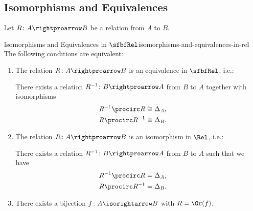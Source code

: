 \subsection{Isomorphisms and Equivalences}\label{subsection-isomorphisms-and-equivalences-in-rel}
Let $R\colon A\rightproarrow B$ be a relation from $A$ to $B$.
\begin{proposition}{Isomorphisms and Equivalences in $\sfbfRel$}{isomorphisms-and-equivalences-in-rel}%
    The following conditions are equivalent:
    \begin{enumerate}
        \item\label{isomorphisms-and-equivalences-in-rel-1}The relation $R\colon A\rightproarrow B$ is an equivalence in $\sfbfRel$, i.e.:
            \begin{itemize}
                \itemstar There exists a relation $R^{-1}\colon B\rightproarrow A$ from $B$ to $A$ together with isomorphisms
                    \begin{align*}
                        R^{-1}\procirc R &\cong \Delta_{A},\\
                        R\procirc R^{-1} &\cong \Delta_{B}.
                    \end{align*}
            \end{itemize}
        \item\label{isomorphisms-and-equivalences-in-rel-2}The relation $R\colon A\rightproarrow B$ is an isomorphism in $\Rel$, i.e.:
            \begin{itemize}
                \itemstar There exists a relation $R^{-1}\colon B\rightproarrow A$ from $B$ to $A$ such that we have
                    \begin{align*}
                        R^{-1}\procirc R &= \Delta_{A},\\
                        R\procirc R^{-1} &= \Delta_{B}.
                    \end{align*}
            \end{itemize}
        \item\label{isomorphisms-and-equivalences-in-rel-3}There exists a bijection $f\colon A\isorightarrow B$ with $R=\Gr(f)$.
    \end{enumerate}
\end{proposition}
